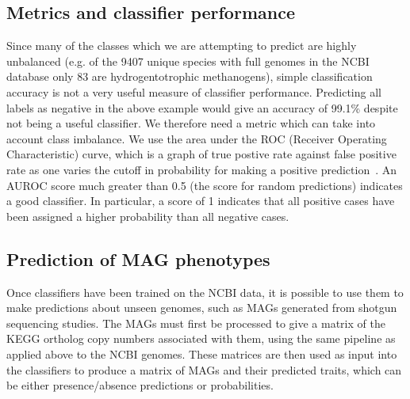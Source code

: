 \documentclass[10pt,letterpaper]{article}
\begin{document}
\subsection*{Metrics and classifier performance}
Since many of the classes which we are attempting to predict are highly unbalanced (e.g. of the 9407 unique species with full genomes in the NCBI database only 83 are hydrogentotrophic methanogens), simple classification accuracy is not a very useful measure of classifier performance. Predicting all labels as negative in the above example would give an accuracy of 99.1\% despite not being a useful classifier. We therefore need a metric which can take into account class imbalance. We use the area under the ROC (Receiver Operating Characteristic) curve, which is a graph of true postive rate against false positive rate as one varies the cutoff in probability for making a positive prediction~\cite{Fawcett2006,Flach2011}. An AUROC score much greater than 0.5 (the score for random predictions) indicates a good classifier. In particular, a score of 1 indicates that all positive cases have been assigned a higher probability than all negative cases.

\subsection*{Prediction of MAG phenotypes}
Once classifiers have been trained on the NCBI data, it is possible to use them to make predictions about unseen genomes, such as MAGs generated from shotgun sequencing studies. The MAGs must first be processed to give a matrix of the KEGG ortholog copy numbers associated with them, using the same pipeline as applied above to the NCBI genomes. These matrices are then used as input into the classifiers to produce a matrix of MAGs and their predicted traits, which can be either presence/absence predictions or probabilities. 
\end{document}
